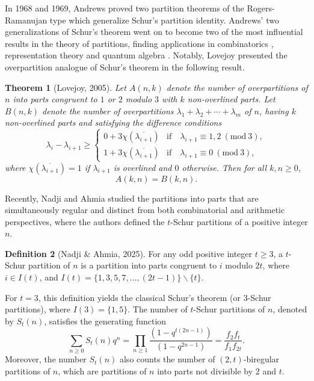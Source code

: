 \documentclass[12pt]{amsart}
\newcommand{\seqnum}[1]{\href{http://oeis.org/#1}{\underline{#1}}}
\theoremstyle{plain}
\newtheorem{theorem}{Theorem}[section]
\theoremstyle{definition}
\newtheorem{definition}[theorem]{Definition}
\begin{document}
In 1968 and 1969, Andrews \cite{Andrews1968a, Andrews1969} proved two partition theorems of the Rogers-Ramanujan type which generalize Schur's partition identity. Andrews' two generalizations of Schur's theorem went on to become two of the most influential results in the theory of partitions, finding applications in combinatorics \cite{Alladi1997, CorteelLovejoy2006, Yee2008}, representation theory \cite{AndrewsOlsson1991} and quantum algebra \cite{Oh2015}. Notably, Lovejoy \cite{Lovejoy2005} presented the overpartition analogue of Schur's theorem in the following result.
\begin{theorem}[Lovejoy, 2005] Let $A(n,k)$ denote the number of overpartitions of $n$ into parts congruent to $1$ or $2$ modulo $3$ with $k$ non-overlined parts. Let $B(n,k)$ denote the number of overpartitions $\lambda_{1}+\lambda_{2}+ \cdots + \lambda_{m}$ of $n$, having $k$ non-overlined parts and satisfying the difference conditions
\[
\lambda_{i}-\lambda_{i+1} \geq
\begin{cases}
0+3 \chi ( \overline{\lambda_{i+1}} ) & \text{if} \quad \lambda_{i+1} \equiv 1,2 \ (\mathrm{mod}\ 3),\\
1+3 \chi ( \overline{\lambda_{i+1}} ) & \text{if} \quad \lambda_{i+1} \equiv 0 \ (\mathrm{mod}\ 3),
\end{cases}
\]
where $\chi ( \overline{\lambda_{i+1}} )=1$ if $\lambda_{i+1}$ is overlined and $0$ otherwise. Then for all $k,n\geq 0$, 
\[
A(k,n)=B(k,n).
\]
\end{theorem}


Recently, Nadji and Ahmia \cite{NadjiAhmia2024} studied the partitions into parts that are simultaneously regular and distinct from both combinatorial and arithmetic perspectives, where the authors defined the $t$-Schur partitions of a positive integer $n$.
\begin{definition}[Nadji \& Ahmia, 2025]
For any odd positive integer $t\geq 3$, a $t$-Schur partition of $n$ is a partition into parts congruent to $i$ modulo $2t$, where $i\in I(t)$, and $I(t)=\lbrace 1, 3, 5, 7, \dots, (2t-1) \rbrace\backslash\lbrace t \rbrace$. 
\end{definition}
For $t=3$, this definition yields the classical Schur's theorem \cite[\seqnum{A003105}]{OEIS} (or $3$-Schur partitions), where $I(3)=\lbrace 1, 5\rbrace$. The number of $t$-Schur partitions of $n$, denoted by $S_{t}(n)$, satisfies the generating function
\[
\sum_{n \geq 0} S_{t}(n) q^{n}=\prod_{n\geq 1}\dfrac{(1-q^{t(2n-1)})}{(1-q^{2n-1})}=\dfrac{f_{2}f_{t}}{f_{1}f_{2 t}}.
\]
Moreover, the number $S_{t}(n)$ also counts the number of $(2,t)$-biregular partitions of $n$, which are partitions of $n$ into parts not divisible by $2$ and $t$.
\end{document}
